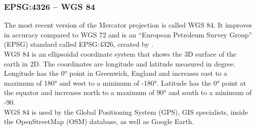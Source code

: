 \subsubsection{EPSG:4326 -- WGS 84}
The most recent version of the Mercator projection is called WGS 84. It improves in accuracy compared to WGS 72 and is an \enquote{European Petroleum Survey Group} (EPSG) standard called EPSG:4326, created by \cite{Decker1986}.\\
WGS 84 is an ellipsoidal coordinate system that shows the 3D surface of the earth in 2D. The coordinates are longitude and latitude measured in degree. Longitude has the 0° point in Greenwich, England and increases east to a maximum of 180° and west to a minimum of -180°. Latitude has the 0° point at the equator and increases north to a maximum of 90° and south to a minimum of -90.\\
WGS 84 is used by the Global Positioning System (GPS), GIS specialists, inside the OpenStreetMap (OSM) database, as well as Google Earth.

